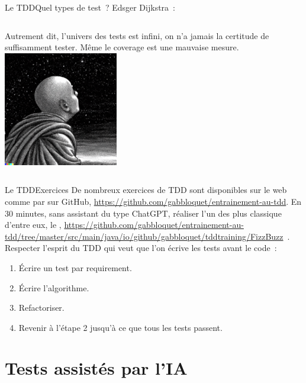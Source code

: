 \documentclass{beamer}
\begin{document}
    \begin{frame}{Le TDD}{Quel types de test~?}
        Edsger Dijkstra~: 
        \bigbreak
        \begin{columns}
            Autrement dit, l'univers des tests est infini, on n'a jamais la certitude de suffisamment tester.
            \bigbreak
            Même le coverage est une mauvaise mesure.
            \centering
            \includegraphics[width=5cm]{image/monk-looking-the-deepness-of-the-stars-in-the-night-sky}
        \end{columns}
    \end{frame}

    \begin{frame}{Le TDD}{Exercices \execcounterdispinc{}}
        De nombreux exercices de TDD sont disponibles sur le web comme par sur GitHub, \url{https://github.com/gabbloquet/entrainement-au-tdd}.
        \bigbreak
        En 30 minutes, sans assistant du type ChatGPT, réaliser l'un des plus classique d'entre eux, le , \url{https://github.com/gabbloquet/entrainement-au-tdd/tree/master/src/main/java/io/github/gabbloquet/tddtraining/FizzBuzz}~.
        Respecter l'esprit du TDD qui veut que l'on écrive les tests avant le code~:
        \begin{enumerate}
            \item Écrire un test par requirement.
            \item Écrire l'algorithme.
            \item Refactoriser.
            \item Revenir à l'étape 2 jusqu'à ce que tous les tests passent.
        \end{enumerate}
    \end{frame}


    \section{Tests assistés par l'IA}\label{sec:tests-assistes-par-ia}
\end{document}
